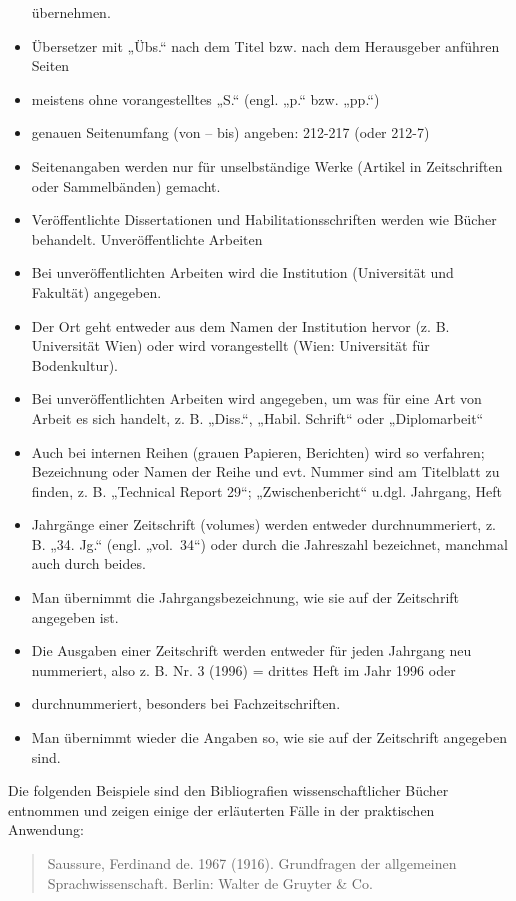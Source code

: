\documentclass[]{book}
\theoremstyle{definition}
\theoremstyle{definition}
\theoremstyle{definition}
\theoremstyle{remark}
\begin{document}
\begin{itemize}
  übernehmen.
\item
  Übersetzer mit „Übs.`` nach dem Titel bzw. nach dem Herausgeber
  anführen Seiten
\item
  meistens ohne vorangestelltes „S.`` (engl. „p.`` bzw. „pp.``)
\item
  genauen Seitenumfang (von -- bis) angeben: 212-217 (oder 212-7)
\item
  Seitenangaben werden nur für unselbständige Werke (Artikel in
  Zeitschriften oder Sammelbänden) gemacht.
\item
  Veröffentlichte Dissertationen und Habilitationsschriften werden wie
  Bücher behandelt. Unveröffentlichte Arbeiten
\item
  Bei unveröffentlichten Arbeiten wird die Institution (Universität und
  Fakultät) angegeben.
\item
  Der Ort geht entweder aus dem Namen der Institution hervor (z. B.
  Universität Wien) oder wird vorangestellt (Wien: Universität für
  Bodenkultur).
\item
  Bei unveröffentlichten Arbeiten wird angegeben, um was für eine Art
  von Arbeit es sich handelt, z. B. „Diss.``, „Habil. Schrift`` oder
  „Diplomarbeit``
\item
  Auch bei internen Reihen (grauen Papieren, Berichten) wird so
  verfahren; Bezeichnung oder Namen der Reihe und evt. Nummer sind am
  Titelblatt zu finden, z. B. „Technical Report 29``; „Zwischenbericht``
  u.dgl. Jahrgang, Heft
\item
  Jahrgänge einer Zeitschrift (volumes) werden entweder durchnummeriert,
  z. B. „34. Jg.`` (engl. „vol.~34``) oder durch die Jahreszahl
  bezeichnet, manchmal auch durch beides.
\item
  Man übernimmt die Jahrgangsbezeichnung, wie sie auf der Zeitschrift
  angegeben ist.
\item
  Die Ausgaben einer Zeitschrift werden entweder für jeden Jahrgang neu
  nummeriert, also z. B. Nr. 3 (1996) = drittes Heft im Jahr 1996 oder
\item
  durchnummeriert, besonders bei Fachzeitschriften.
\item
  Man übernimmt wieder die Angaben so, wie sie auf der Zeitschrift
  angegeben sind.
\end{itemize}

Die folgenden Beispiele sind den Bibliografien wissenschaftlicher Bücher
entnommen und zeigen einige der erläuterten Fälle in der praktischen
Anwendung:

\begin{quote}
Saussure, Ferdinand de. 1967 (1916). Grundfragen der allgemeinen
Sprachwissenschaft. Berlin: Walter de Gruyter \& Co.
\end{quote}
\end{document}
